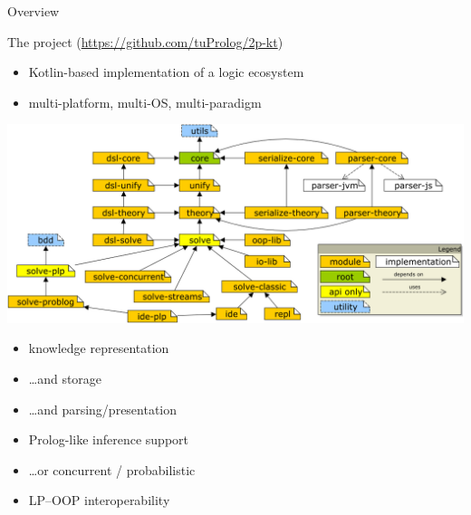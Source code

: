 \documentclass[presentation]{beamer}\mode<presentation>{\usetheme{AMSBolognaFC}}
\begin{document}
\begin{frame}{Overview}
    \begin{block}{The \twopkt{} project \hfill (\url{https://github.com/tuProlog/2p-kt})}
        \begin{itemize}
            \item Kotlin-based implementation of a logic ecosystem
            \item multi-platform, multi-OS, multi-paradigm
        \end{itemize}
    \end{block}

    \begin{center}
        \includegraphics[width=.7\linewidth]{figures/project-map.png}
    \end{center}

    \vspace{-.5cm}

    \begin{multicols}{2}
        \begin{itemize}\small
            \item knowledge representation

            \item \ldots and storage

            \item \ldots and parsing/presentation

            \item Prolog-like inference support
            \item \ldots or concurrent / probabilistic

            \item LP--OOP interoperability
        \end{itemize}
    \end{multicols}
\end{frame}
\end{document}
